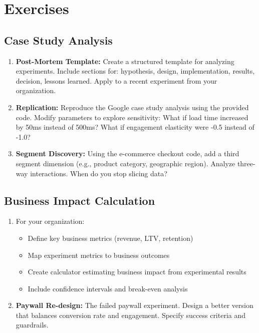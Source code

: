 \section{Exercises}

\subsection{Case Study Analysis}

\begin{enumerate}
    \item \textbf{Post-Mortem Template:} Create a structured template for analyzing experiments. Include sections for: hypothesis, design, implementation, results, decision, lessons learned. Apply to a recent experiment from your organization.

    \item \textbf{Replication:} Reproduce the Google case study analysis using the provided code. Modify parameters to explore sensitivity: What if load time increased by 50ms instead of 500ms? What if engagement elasticity were -0.5 instead of -1.0?

    \item \textbf{Segment Discovery:} Using the e-commerce checkout code, add a third segment dimension (e.g., product category, geographic region). Analyze three-way interactions. When do you stop slicing data?
\end{enumerate}

\subsection{Business Impact Calculation}

\begin{enumerate}
    \item For your organization:
    \begin{itemize}
        \item Define key business metrics (revenue, LTV, retention)
        \item Map experiment metrics to business outcomes
        \item Create calculator estimating business impact from experimental results
        \item Include confidence intervals and break-even analysis
    \end{itemize}

    \item \textbf{Paywall Re-design:} The failed paywall experiment. Design a better version that balances conversion rate and engagement. Specify success criteria and guardrails.
\end{enumerate}

